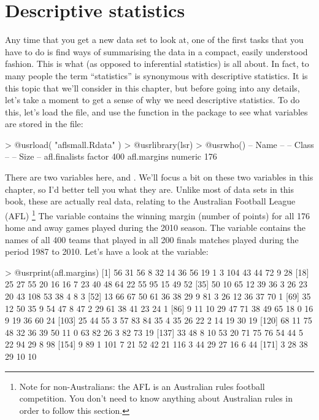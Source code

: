 


\chapter{Descriptive statistics\label{ch:descriptives}}


Any time that you get a new data set to look at, one of the first tasks that you have to do is find ways of summarising the data in a compact, easily understood fashion. This is what  (as opposed to inferential statistics) is all about. In fact, to many people the term ``statistics'' is synonymous with descriptive statistics. It is this topic that we'll consider in this chapter, but before going into any details, let's take a moment to get a sense of why we need descriptive statistics. To do this, let's load the  file, and use the  function in the  package to see what variables are stored in the file:
\begin{rblock1}
> @usr{load( "aflsmall.Rdata" )}
> @usr{library(lsr)}
> @usr{who()}
   -- Name --      -- Class --   -- Size --
   afl.finalists   factor        400       
   afl.margins     numeric       176     
\end{rblock1}
There are two variables here,  and . We'll focus a bit on these two variables in this chapter, so I'd better tell you what they are. Unlike most of data sets in this book, these are actually real data, relating to the Australian Football League (AFL) \footnote{Note for non-Australians: the AFL is an Australian rules football competition. You don't need to know anything about Australian rules in order to follow this section.} The  variable contains the winning margin (number of points) for all 176 home and away games played during the 2010 season. The  variable contains the names of all 400 teams that played in all 200 finals matches played during the period 1987 to 2010.  Let's have a look at the  variable:
\begin{rblock1}
> @usr{print(afl.margins)}
  [1]  56  31  56   8  32  14  36  56  19   1   3 104  43  44  72   9  28
 [18]  25  27  55  20  16  16   7  23  40  48  64  22  55  95  15  49  52
 [35]  50  10  65  12  39  36   3  26  23  20  43 108  53  38   4   8   3
 [52]  13  66  67  50  61  36  38  29   9  81   3  26  12  36  37  70   1
 [69]  35  12  50  35   9  54  47   8  47   2  29  61  38  41  23  24   1
 [86]   9  11  10  29  47  71  38  49  65  18   0  16   9  19  36  60  24
[103]  25  44  55   3  57  83  84  35   4  35  26  22   2  14  19  30  19
[120]  68  11  75  48  32  36  39  50  11   0  63  82  26   3  82  73  19
[137]  33  48   8  10  53  20  71  75  76  54  44   5  22  94  29   8  98
[154]   9  89   1 101   7  21  52  42  21 116   3  44  29  27  16   6  44
[171]   3  28  38  29  10  10
\end{rblock1}
